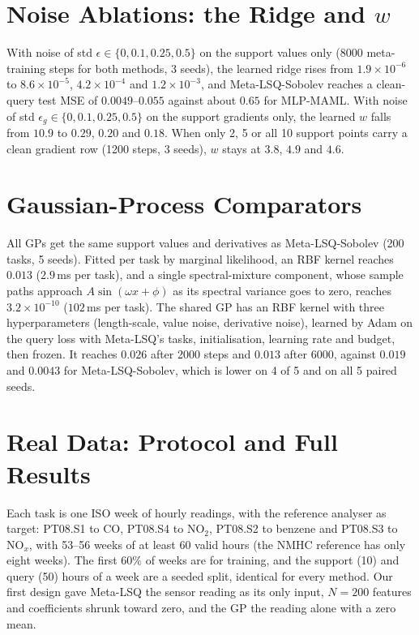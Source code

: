 \documentclass[fullpaper,final]{nldl}
\theoremstyle{plain}
\theoremstyle{definition}
\begin{document}
\section{Noise Ablations: the Ridge and $w$}
\label{app:wmodel}

With noise of std $\epsilon \in \{0,0.1,0.25,0.5\}$ on the support values only
(8000 meta-training steps for both methods, 3 seeds), the learned ridge rises from
$1.9\!\times\!10^{-6}$ to $8.6\!\times\!10^{-5}$, $4.2\!\times\!10^{-4}$ and
$1.2\!\times\!10^{-3}$, and Meta-LSQ-Sobolev reaches a clean-query test MSE of
$0.0049$--$0.055$ against about $0.65$ for MLP-MAML. With noise of std
$\epsilon_g \in \{0,0.1,0.25,0.5\}$ on the support gradients only, the learned $w$
falls from $10.9$ to $0.29$, $0.20$ and $0.18$. When only 2, 5 or all 10 support
points carry a clean gradient row (1200 steps, 3 seeds), $w$ stays at $3.8$, $4.9$
and $4.6$.

\section{Gaussian-Process Comparators}
\label{app:gp}

All GPs get the same support values and derivatives as Meta-LSQ-Sobolev (200 tasks,
5 seeds). Fitted per task by marginal likelihood, an RBF kernel reaches $0.013$
($2.9$\,ms per task), and a single spectral-mixture component, whose sample paths
approach $A\sin(\omega x+\phi)$ as its spectral variance goes to zero, reaches $3.2\!\times\!10^{-10}$ ($102$\,ms per
task). The shared GP has an RBF kernel with three hyperparameters (length-scale,
value noise, derivative noise), learned by Adam on the query loss with Meta-LSQ's
tasks, initialisation, learning rate and budget, then frozen. It reaches $0.026$
after 2000 steps and $0.013$ after 6000, against $0.019$ and $0.0043$ for
Meta-LSQ-Sobolev, which is lower on 4 of 5 and on all 5 paired seeds.

\section{Real Data: Protocol and Full Results}
\label{app:real}

Each task is one ISO week of hourly readings, with the reference analyser as target:
PT08.S1 to CO, PT08.S4 to NO$_2$, PT08.S2 to benzene and PT08.S3 to NO$_x$, with
53--56 weeks of at least 60 valid hours (the NMHC reference has only eight weeks).
The first $60\%$ of weeks are for training, and the support (10) and query (50)
hours of a week are a seeded split, identical for every method. Our first design
gave Meta-LSQ the sensor reading as its only input, $N{=}200$ features and
coefficients shrunk toward zero, and the GP the reading alone with a zero mean.
\end{document}
